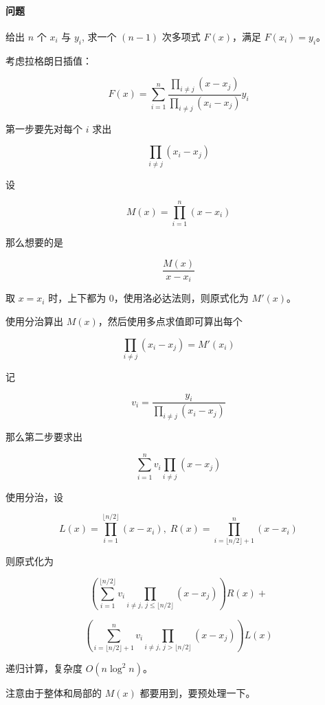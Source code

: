 \paragraph{问题} 给出 $n$ 个 $x_i$ 与 $y_i$, 求一个 $(n - 1)$ 次多项式 $F(x)$，满足 $F(x_i) = y_i$。

考虑拉格朗日插值：

$$ F(x) = \sum_{i = 1} ^ n \frac {\prod_{i \neq j} (x - x_j)} {\prod_{i \neq j} (x_i - x_j)} y_i $$

第一步要先对每个 $i$ 求出

$$ \prod_{i \neq j} (x_i - x_j) $$

设

$$ M(x) = \prod_{i = 1} ^ n (x - x_i) $$

那么想要的是

$$ \frac {M(x)} {x - x_i} $$

取 $x=x_i$ 时，上下都为 0，使用洛必达法则，则原式化为 $M'(x)$。

使用分治算出 $M(x)$，然后使用多点求值即可算出每个

$$ \prod_{i \neq j} (x_i - x_j) = M'(x_i) $$

记

$$ v_i = \frac {y_i} {\prod_{i \neq j} (x_i - x_j)} $$

那么第二步要求出

$$ \sum_{i = 1} ^ n v_i \prod_{i \neq j} (x - x_j) $$

使用分治，设

$$ L(x) = \prod_{i = 1} ^ {\lfloor n / 2 \rfloor} (x - x_i), \; R(x) = \prod_{i = \lfloor n / 2 \rfloor + 1} ^ n (x - x_i)$$

则原式化为

$$ \left( \sum_{i = 1} ^ {\lfloor n / 2 \rfloor} v_i \prod_{i \neq j ,\, j \leq \lfloor n / 2 \rfloor} (x - x_j) \right) R(x) + $$

$$ \left( \sum_{i = \lfloor n / 2 \rfloor + 1} ^ n v_i \prod_{i \neq j ,\, j > \lfloor n / 2 \rfloor} (x - x_j) \right) L(x) $$

递归计算，复杂度 $O(n\log^2n)$。

注意由于整体和局部的 $M(x)$ 都要用到，要预处理一下。

\inputminted{cpp}{../src/math/多项式快速插值.cpp}
